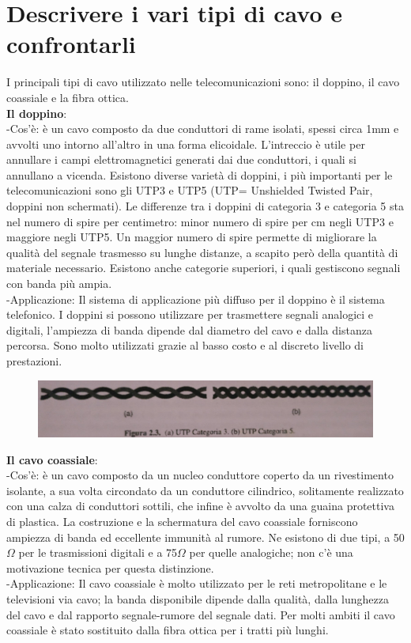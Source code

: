 \section{Descrivere i vari tipi di cavo e confrontarli}
I principali tipi di cavo utilizzato nelle telecomunicazioni sono: il doppino, il cavo coassiale e la fibra ottica. \\
\textbf{Il doppino}:\\
-Cos’è: è un cavo composto da due conduttori di rame isolati, spessi circa 1mm e avvolti uno intorno all’altro in una forma elicoidale. L’intreccio è utile per annullare i campi elettromagnetici generati dai due conduttori, i quali si annullano a vicenda. Esistono diverse varietà di doppini, i più importanti per le telecomunicazioni sono gli UTP3 e UTP5 (UTP= Unshielded Twisted Pair, doppini non schermati). Le differenze tra i doppini di categoria 3 e categoria 5 sta nel numero di spire per centimetro: minor numero di spire per cm negli UTP3 e maggiore negli UTP5. Un maggior numero di spire permette di migliorare la qualità del segnale trasmesso su lunghe distanze, a scapito però della quantità di materiale necessario. Esistono anche categorie superiori, i quali gestiscono segnali con banda più ampia.  \\
-Applicazione: Il sistema di applicazione più diffuso per il doppino è il sistema telefonico. I doppini si possono utilizzare per trasmettere segnali analogici e digitali, l’ampiezza di banda dipende dal diametro del cavo e dalla distanza percorsa. Sono molto utilizzati grazie al basso costo e al discreto livello di prestazioni.

\begin{figure}[H]
\centering
\includegraphics[scale=0.7]{res/img/3_Doppino.jpg}
\end{figure}

\textbf{Il cavo coassiale}: \\
-Cos’è: è un cavo composto da un nucleo conduttore coperto da un rivestimento isolante, a sua volta circondato da un conduttore cilindrico, solitamente realizzato con una calza di conduttori sottili, che infine è avvolto da una guaina protettiva di plastica. La costruzione e la schermatura del cavo coassiale forniscono ampiezza di banda ed eccellente immunità al rumore. Ne esistono di due tipi, a 50$\Omega$ per le trasmissioni digitali e a 75$\Omega$ per quelle analogiche; non c’è una motivazione tecnica per questa distinzione. \\
-Applicazione: Il cavo coassiale è molto utilizzato per le reti metropolitane e le televisioni via cavo; la banda disponibile dipende dalla qualità, dalla lunghezza del cavo e dal rapporto segnale-rumore del segnale dati. Per molti ambiti il cavo coassiale è stato sostituito dalla fibra ottica per i tratti più lunghi.

